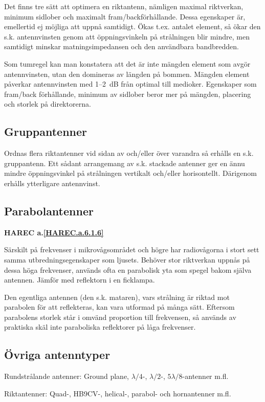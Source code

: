 Det finns tre sätt att optimera en riktantenn, nämligen maximal
riktverkan, minimum sidlober och maximalt fram/backförhållande. Dessa
egenskaper är, emellertid ej möjliga att uppnå samtidigt. Ökas t.ex.
antalet element, så ökar den s.k. antennvinsten genom att
öppningsvinkeln på strålningen blir mindre, men samtidigt minskar
matningsimpedansen och den användbara bandbredden.

Som tumregel kan man konstatera att det är inte mängden element som
avgör antennvinsten, utan den domineras av längden på bommen.
Mängden element påverkar antennvinsten med 1--2~dB från optimal till
medioker.
Egenskaper som fram/back förhållande, minimum av sidlober beror mer
på mängden, placering och storlek på direktorerna.

\subsection{Gruppantenner}

Ordnas flera riktantenner vid sidan av och/eller över varandra så
erhålls en s.k. gruppantenn. Ett sådant arrangemang av s.k. stackade
antenner ger en ännu mindre öppningsvinkel på strålningen vertikalt
och/eller horisontellt. Därigenom erhålls ytterligare antennvinst.

\subsection{Parabolantenner}
\textbf{
HAREC a.\ref{HAREC.a.6.1.6}\label{myHAREC.a.6.1.6}
}

Särskilt på frekvenser i mikrovågsområdet och högre har radiovågorna i
stort sett samma utbredningsegenskaper som ljusets.
Behöver stor riktverkan uppnås på dessa höga frekvenser, används ofta en
parabolisk yta som spegel bakom själva antennen.
Jämför med reflektorn i en ficklampa.

Den egentliga antennen (den s.k. mataren), vars strålning är riktad
mot parabolen för att reflekteras, kan vara utformad på många
sätt. Eftersom parabolens storlek står i omvänd proportion till
frekvensen, så används av praktiska skäl inte paraboliska reflektorer
på låga frekvenser.

\subsection{Övriga antenntyper}

Rundstrålande antenner: Ground plane, \(\lambda/4\)-, \(\lambda/2\)-,
\(5\lambda/8\)-antenner m.fl.

Riktantenner: Quad-, HB9CV-, helical-, parabol- och hornantenner m.fl.
